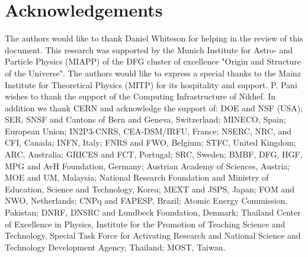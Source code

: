 \section*{Acknowledgements}

The authors would like to thank Daniel Whiteson for helping in the review of this document. 
This research was supported by the Munich Institute for Astro- and Particle Physics (MIAPP) of the DFG cluster of excellence "Origin and Structure of the Universe". The authors would like to express a special thanks to the Mainz Institute for Theoretical Physics (MITP) for its hospitality and support. P. Pani wishes to thank the support of the Computing Infrastructure of Nikhef.
In addition we thank CERN and acknowledge the support of:
DOE and NSF (USA);
SER, SNSF and Cantons of Bern and Geneva, Switzerland; 
MINECO, Spain;
European Union;
IN2P3-CNRS, CEA-DSM/IRFU, France;
NSERC, NRC, and CFI, Canada;
INFN, Italy;
FNRS and FWO, Belgium; 
STFC, United Kingdom;
ARC, Australia; 
GRICES and FCT, Portugal;
SRC, Sweden;
BMBF, DFG, HGF, MPG and AvH Foundation, Germany; 
Austrian Academy of Sciences, Austria; 
MOE and UM, Malaysia;
National Research Foundation and Ministry of Education, Science and Technology, Korea;
MEXT and JSPS, Japan; 
FOM and NWO, Netherlands;
CNPq and FAPESP, Brazil;
Atomic Energy Commission, Pakistan;
DNRF, DNSRC and Lundbeck Foundation, Denmark;
Thailand Center of Excellence in Physics, Institute for the Promotion of Teaching Science and Technology, Special Task Force for Activating Research and National Science and Technology Development Agency, Thailand; 
MOST, Taiwan.

\clearpage